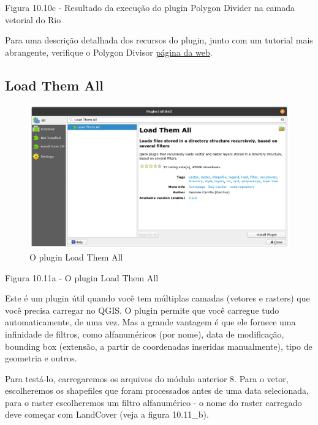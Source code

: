 \documentclass[
]{krantz}
\begin{document}
Figura 10.10c - Resultado da execução do plugin Polygon Divider na camada vetorial do Rio

Para uma descrição detalhada dos recursos do plugin, junto com um tutorial mais abrangente, verifique o Polygon Divisor \href{https://github.com/jonnyhuck/RFCL-PolygonDivider}{página da web}.

\hypertarget{load-them-all}{%
\subsection{Load Them All}\label{load-them-all}}

\begin{figure}
\centering
\includegraphics{media/modulo10/fig1011_a.png}
\caption{O plugin Load Them All}
\end{figure}

Figura 10.11a - O plugin Load Them All

Este é um plugin útil quando você tem múltiplas camadas (vetores e rasters) que você precisa carregar no QGIS. O plugin permite que você carregue tudo automaticamente, de uma vez. Mas a grande vantagem é que ele fornece uma infinidade de filtros, como alfanuméricos (por nome), data de modificação, bounding box (extensão, a partir de coordenadas inseridas manualmente), tipo de geometria e outros.

Para testá-lo, carregaremos os arquivos do módulo anterior 8. Para o vetor, escolheremos os shapefiles que foram processados \hspace{0pt}\hspace{0pt}antes de uma data selecionada, para o raster escolheremos um filtro alfanumérico - o nome do raster carregado deve começar com LandCover (veja a figura 10.11\_b).
\end{document}
